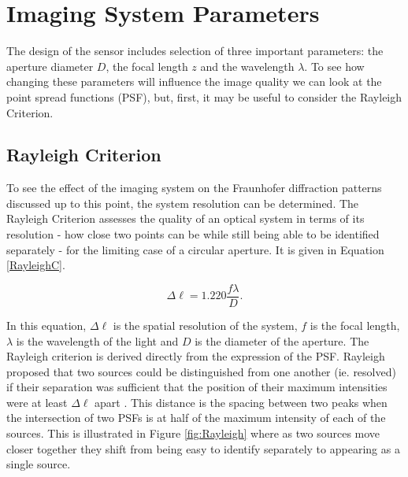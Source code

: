 \section{Imaging System Parameters}

The design of the sensor includes selection of three important parameters: the aperture diameter $D$, the focal length $z$ and the wavelength $\lambda$.  To see how changing these parameters will influence the image quality we can look at the point spread functions (PSF), but, first, it may be useful to consider the Rayleigh Criterion.

\subsection{Rayleigh Criterion}
To see the effect of the imaging system on the Fraunhofer diffraction patterns discussed up to this point, the system resolution can be determined.  The Rayleigh Criterion assesses the quality of an optical system in terms of its resolution - how close two points can be while still being able to be identified separately - for the limiting case of a circular aperture.  It is given in Equation \ref{RayleighC}.

\begin{equation}
\label{RayleighC}
	 \Delta \ell = 1.220 \frac{ f \lambda}{D}.
\end{equation}

In this equation, $\Delta \ell$ is the spatial resolution of the system, $f$ is the focal length, $\lambda$ is the wavelength of the light and $D$ is the diameter of the aperture.  The Rayleigh criterion is derived directly from the expression of the PSF.  Rayleigh proposed that two sources could be distinguished from one another (ie. resolved) if their separation was sufficient that the position of their maximum intensities were at least $\Delta \ell$ apart \cite{AOLectureNotes}.  This distance is the spacing between two peaks when the intersection of two PSFs is at half of the maximum intensity of each of the sources. This is illustrated in Figure \ref{fig:Rayleigh} where as two sources move closer together they shift from being easy to identify separately to appearing as a single source.

